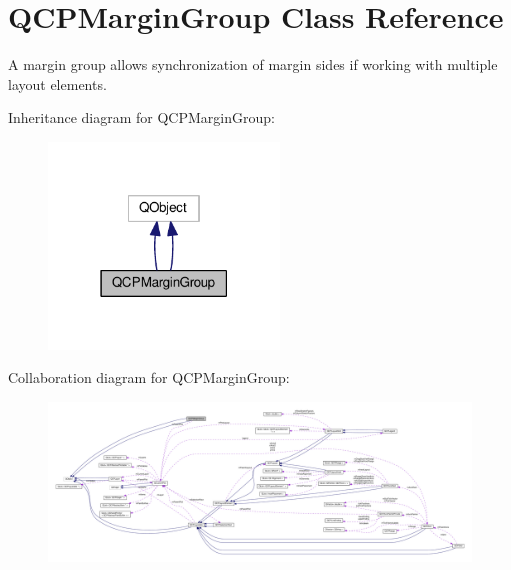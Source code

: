 \hypertarget{class_q_c_p_margin_group}{}\section{Q\+C\+P\+Margin\+Group Class Reference}
\label{class_q_c_p_margin_group}


A margin group allows synchronization of margin sides if working with multiple layout elements.  




Inheritance diagram for Q\+C\+P\+Margin\+Group\+:\nopagebreak
\begin{figure}[H]
\begin{center}
\leavevmode
\includegraphics[width=174pt]{class_q_c_p_margin_group__inherit__graph}
\end{center}
\end{figure}


Collaboration diagram for Q\+C\+P\+Margin\+Group\+:\nopagebreak
\begin{figure}[H]
\begin{center}
\leavevmode
\includegraphics[width=350pt]{class_q_c_p_margin_group__coll__graph}
\end{center}
\end{figure}

